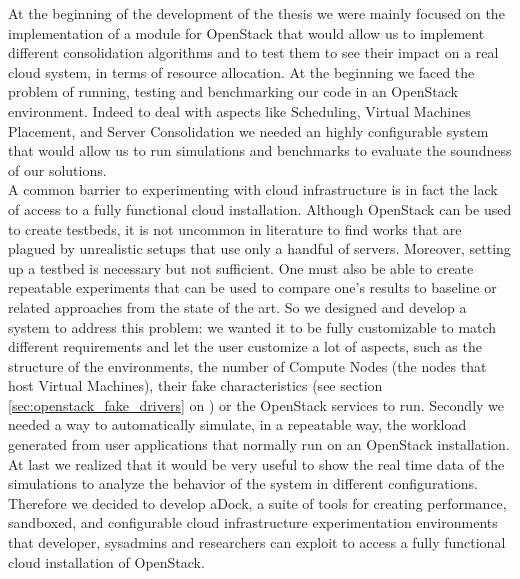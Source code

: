  
At the beginning of the development of the thesis we were mainly focused on the implementation of a module for OpenStack that would allow us to implement different consolidation algorithms and to test them to see their impact on a real cloud system, in terms of resource allocation. At the beginning we faced the problem of running, testing and benchmarking our code in an OpenStack environment. Indeed to deal with aspects like Scheduling, Virtual Machines Placement, and Server Consolidation we needed an highly configurable system that would allow us to run simulations and benchmarks to evaluate the soundness of our solutions.\\ 
A common barrier to experimenting with cloud infrastructure is in fact the lack of access to a fully functional cloud installation. Although OpenStack can be used to create testbeds, it is not uncommon in literature to find works that are plagued by unrealistic setups that use only a handful of servers. Moreover, setting up a testbed is necessary but not sufficient. One must also be able to create repeatable experiments that can be used to compare one’s results to baseline or related approaches from the state of the art.
So we designed and develop a system to address this problem: we wanted it to be fully customizable to match different requirements and let the user customize a lot of aspects, such as the structure of the environments, the number of Compute Nodes (the nodes that host Virtual Machines), their fake characteristics (see section \ref{sec:openstack_fake_drivers} on ) or the OpenStack services to run. Secondly we needed a way to automatically simulate, in a repeatable way, the workload generated from user applications that normally run on an OpenStack installation. At last we realized that it would be very useful to show the real time data of the simulations to analyze the behavior of the system in different configurations.
Therefore we decided to develop aDock, a suite of tools for creating performance, sandboxed, and configurable cloud infrastructure experimentation environments that developer, sysadmins and researchers can exploit to access a fully functional cloud installation of OpenStack.
